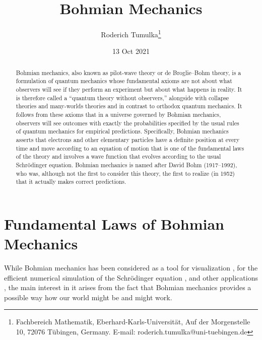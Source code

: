 \documentclass[12pt]{article}
\title{Bohmian Mechanics}
\author{
Roderich Tumulka\footnote{Fachbereich Mathematik, Eberhard-Karls-Universit\"at,
	Auf der Morgenstelle 10, 72076 T\"ubingen, Germany. E-mail: roderich.tumulka@uni-tuebingen.de}
}
\date{13 Oct 2021}
\begin{document}
\maketitle
\begin{abstract}
Bohmian mechanics, also known as pilot-wave theory or de Broglie--Bohm theory, is a formulation of quantum mechanics whose fundamental axioms are not about what observers will see if they perform an experiment but about what happens in reality. It is therefore called a ``quantum theory without observers,'' alongside with collapse theories \cite{Bell87,Lew} and many-worlds theories \cite{Sau,AGTZ11} and in contrast to orthodox quantum mechanics. It follows from these axioms that in a universe governed by Bohmian mechanics, observers will see outcomes with exactly the probabilities specified by the usual rules of quantum mechanics for empirical predictions. Specifically, Bohmian mechanics asserts that electrons and other elementary particles have a definite position at every time and move according to an equation of motion that is one of the fundamental laws of the theory and involves a wave function that evolves according to the usual Schr\"odinger equation. Bohmian mechanics is named after David Bohm (1917--1992), who was, although not the first to consider this theory, the first to realize (in 1952) that it actually makes correct predictions.
\end{abstract}

\newpage


\section{Fundamental Laws of Bohmian Mechanics}

While Bohmian mechanics has been considered as a tool for visualization \cite{philippidis79}, for the efficient numerical simulation of the Schr\"odinger equation \cite{Chat}, and other applications \cite{Ori}, the main interest in it arises from the fact that Bohmian mechanics provides a possible way how our world might be and might work.
\end{document}

